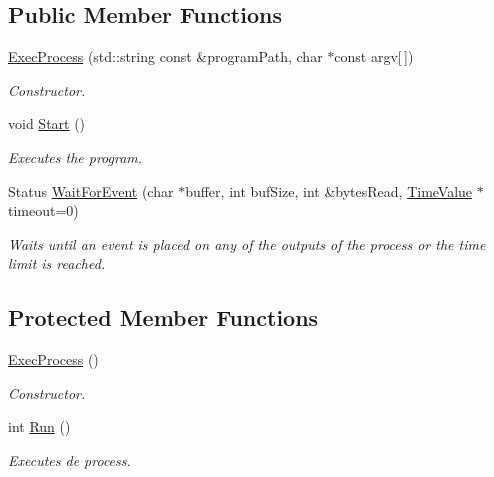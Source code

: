 \subsection*{Public Member Functions}
\begin{DoxyCompactItemize}
\item 
\hyperlink{class_common_1_1_exec_process_a3893a568fd996514f18877b5cbf05065}{Exec\-Process} (std\-::string const \&program\-Path, char $\ast$const argv\mbox{[}$\,$\mbox{]})
\begin{DoxyCompactList}\small\item\em Constructor. \end{DoxyCompactList}\item 
void \hyperlink{class_common_1_1_exec_process_aa8771f96b42438bbcce9474fe2ad1e8f}{Start} ()
\begin{DoxyCompactList}\small\item\em Executes the program. \end{DoxyCompactList}\item 
Status \hyperlink{class_common_1_1_exec_process_a2b4ac9c756fcf3b3e9c8ddc4d6a9d5a6}{Wait\-For\-Event} (char $\ast$buffer, int buf\-Size, int \&bytes\-Read, \hyperlink{class_common_1_1_time_value}{Time\-Value} $\ast$timeout=0)
\begin{DoxyCompactList}\small\item\em Waits until an event is placed on any of the outputs of the process or the time limit is reached. \end{DoxyCompactList}\end{DoxyCompactItemize}
\subsection*{Protected Member Functions}
\begin{DoxyCompactItemize}
\item 
\hypertarget{class_common_1_1_exec_process_a2f79359e3f1c40dfc080186ddeb28379}{\hyperlink{class_common_1_1_exec_process_a2f79359e3f1c40dfc080186ddeb28379}{Exec\-Process} ()}\label{class_common_1_1_exec_process_a2f79359e3f1c40dfc080186ddeb28379}

\begin{DoxyCompactList}\small\item\em Constructor. \end{DoxyCompactList}\item 
\hypertarget{class_common_1_1_exec_process_abf41d59985934b3d78cf2e244a6fc5db}{int \hyperlink{class_common_1_1_exec_process_abf41d59985934b3d78cf2e244a6fc5db}{Run} ()}\label{class_common_1_1_exec_process_abf41d59985934b3d78cf2e244a6fc5db}

\begin{DoxyCompactList}\small\item\em Executes de process. \end{DoxyCompactList}\end{DoxyCompactItemize}
